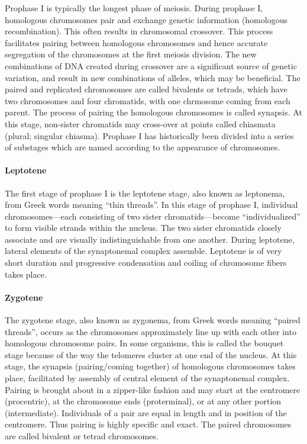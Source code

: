 Prophase I is typically the longest phase of meiosis. During prophase I, homologous chromosomes pair and exchange genetic information (homologous recombination). This often results in chromosomal crossover. This process facilitates pairing between homologous chromosomes and hence accurate segregation of the chromosomes at the first meiosis division. The new combinations of DNA created during crossover are a significant source of genetic variation, and result in new combinations of alleles, which may be beneficial. The paired and replicated chromosomes are called bivalents or tetrads, which have two chromosomes and four chromatids, with one chrmosome coming from each parent. The process of pairing the homologous chromosomes is called synapsis. At this stage, non-sister chromatids may cross-over at points called chiasmata (plural; singular chiasma). Prophase I has historically been divided into a series of substages which are named according to the appearance of chromosomes.

\hypertarget{leptotene}{%
\paragraph{Leptotene}\label{leptotene}}

The first stage of prophase I is the leptotene stage, also known as leptonema, from Greek words meaning ``thin threads''. In this stage of prophase I, individual chromosomes---each consisting of two sister chromatids---become ``individualized'' to form visible strands within the nucleus. The two sister chromatids closely associate and are visually indistinguishable from one another. During leptotene, lateral elements of the synaptonemal complex assemble. Leptotene is of very short duration and progressive condensation and coiling of chromosome fibers takes place.

\hypertarget{zygotene}{%
\paragraph{Zygotene}\label{zygotene}}

The zygotene stage, also known as zygonema, from Greek words meaning ``paired threads'', occurs as the chromosomes approximately line up with each other into homologous chromosome pairs. In some organisms, this is called the bouquet stage because of the way the telomeres cluster at one end of the nucleus. At this stage, the synapsis (pairing/coming together) of homologous chromosomes takes place, facilitated by assembly of central element of the synaptonemal complex. Pairing is brought about in a zipper-like fashion and may start at the centromere (procentric), at the chromosome ends (proterminal), or at any other portion (intermediate). Individuals of a pair are equal in length and in position of the centromere. Thus pairing is highly specific and exact. The paired chromosomes are called bivalent or tetrad chromosomes.

